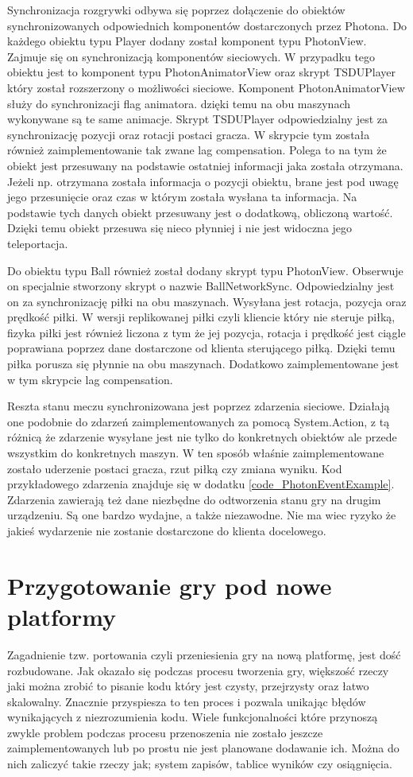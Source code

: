 \documentclass[a4paper,12pt,twoside,openany]{report}
\begin{document}
Synchronizacja rozgrywki odbywa się poprzez dołączenie do obiektów synchronizowanych odpowiednich komponentów dostarczonych przez Photona. Do każdego obiektu typu Player dodany został komponent typu PhotonView. Zajmuje się on synchronizacją komponentów sieciowych. W przypadku tego obiektu jest to komponent typu PhotonAnimatorView oraz skrypt TSDUPlayer który został rozszerzony o możliwości sieciowe. Komponent PhotonAnimatorView służy do synchronizacji flag animatora. dzięki temu na obu maszynach wykonywane są te same animacje. Skrypt TSDUPlayer odpowiedzialny jest za synchronizację pozycji oraz rotacji postaci gracza. W skrypcie tym została również zaimplementowanie tak zwane lag compensation. Polega to na tym że obiekt jest przesuwany na podstawie ostatniej informacji jaka została otrzymana. Jeżeli np. otrzymana została informacja o pozycji obiektu, brane jest pod uwagę jego przesunięcie oraz czas w którym została wysłana ta informacja. Na podstawie tych danych obiekt przesuwany jest o dodatkową, obliczoną wartość. Dzięki temu obiekt przesuwa się nieco płynniej i nie jest widoczna jego teleportacja. 

Do obiektu typu Ball również został dodany skrypt typu PhotonView. Obserwuje on specjalnie stworzony skrypt o nazwie BallNetworkSync. Odpowiedzialny jest on za synchronizację piłki na obu maszynach. Wysyłana jest rotacja, pozycja oraz prędkość piłki. W wersji replikowanej piłki czyli kliencie który nie steruje piłką, fizyka piłki jest również liczona z tym że jej pozycja, rotacja i prędkość jest ciągle poprawiana poprzez dane dostarczone od klienta sterującego piłką. Dzięki temu piłka porusza się płynnie na obu maszynach. Dodatkowo zaimplementowane jest w tym skrypcie lag compensation.  

Reszta stanu meczu synchronizowana jest poprzez zdarzenia sieciowe. Działają one podobnie do zdarzeń zaimplementowanych za pomocą System.Action, z tą różnicą że zdarzenie wysyłane jest nie tylko do konkretnych obiektów ale przede wszystkim do konkretnych maszyn. W ten sposób właśnie zaimplementowane zostało uderzenie postaci gracza, rzut piłką czy zmiana wyniku. Kod przykładowego zdarzenia znajduje się w dodatku \ref{code_PhotonEventExample}. Zdarzenia zawierają też dane niezbędne do odtworzenia stanu gry na drugim urządzeniu. Są one bardzo wydajne, a także niezawodne. Nie ma wiec ryzyko że jakieś wydarzenie nie  zostanie dostarczone do klienta docelowego.




\section{Przygotowanie gry pod nowe platformy}
Zagadnienie tzw. portowania czyli przeniesienia gry na nową platformę, jest dość rozbudowane. Jak okazało się podczas procesu tworzenia gry, większość rzeczy jaki można zrobić to pisanie kodu który jest czysty, przejrzysty oraz łatwo skalowalny. Znacznie przyspiesza to ten proces i pozwala unikając błędów wynikających z niezrozumienia kodu. Wiele funkcjonalności które przynoszą zwykle problem podczas procesu przenoszenia nie zostało jeszcze zaimplementowanych lub po prostu nie jest planowane dodawanie ich. Można do nich zaliczyć takie rzeczy jak; system zapisów, tablice wyników czy osiągnięcia.
\end{document}

